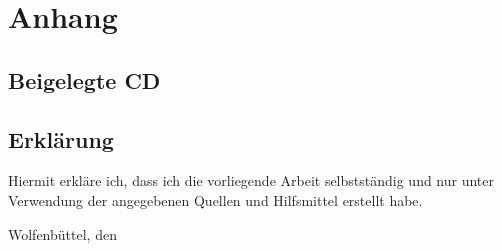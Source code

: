 \documentclass[
  a4paper,					    %
  twoside,
  DIV=calc,     				%
  bibliography=totoc,
  cleardoublepage=empty,
  ngerman,     					%
  final       					%
]{scrbook}
\begin{document}

\appendix
\part*{Anhang}










\backmatter



\chapter{Beigelegte CD}
\label{sec:BeigelegteCD}


\chapter{Erklärung}
\label{sec:Erklärung}
Hiermit erkläre ich, dass ich die vorliegende Arbeit selbstständig und nur unter Verwendung der angegebenen Quellen und Hilfsmittel erstellt habe.
\vspace{2.5cm} \par
Wolfenbüttel, den %


\glsaddall
\printglossaries


%
\nocite{*}
%
\begin{singlespace}

\end{singlespace}
\end{document}
